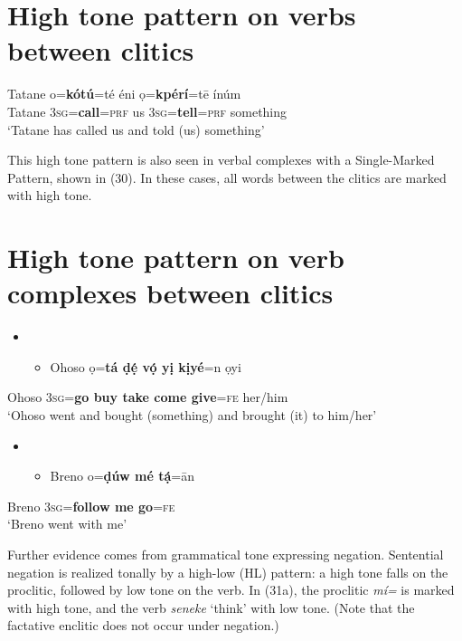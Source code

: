 \documentclass[output=paper]{langsci/langscibook}
\begin{document}
\chapter[High tone pattern on verbs between clitics]{High tone pattern on verbs between clitics}
\label{bkm:Ref436500051}\gll Tatane  o=\textbf{kótú}=té     éni   ọ=\textbf{kpérí}=t\={e}     ínúm\\
     Tatane  3\textsc{sg}=\textbf{call}=\textsc{prf}\textbf{ }  us  \textbf{ }3\textsc{sg}=\textbf{tell}=\textsc{prf}  something\\
\glt ‘Tatane has called us and told (us) something’ \citep[285]{Kari2003a} 
\z

This high tone pattern is also seen in verbal complexes with a Single-Marked Pattern, shown in (30). In these cases, all words between the clitics are marked with high tone. 

\chapter[High tone pattern on verb complexes between clitics ]{High tone pattern on verb complexes between clitics }
\label{bkm:Ref449533464}\begin{itemize}
\item \setcounter{itemize}{0}
\begin{itemize}
\item \gll Ohoso   ọ=\textbf{tá  ḍẹ́    vọ́    yị    kịyé}=n   ọyi\\
\end{itemize}
\end{itemize}
     Ohoso    \textsc{3sg}=\textbf{go  buy    take  come  give}=\textsc{fe}   her/him\\
\glt ‘Ohoso went and bought (something) and brought (it) to him/her’ \citep[121]{Kari2004}
\z

\begin{itemize}
\item \setcounter{itemize}{0}
\begin{itemize}
\item \gll Breno   o=\textbf{ḍúw    mé   tạ́}=\={a}n\\
\end{itemize}
\end{itemize}
     Breno   3\textsc{sg}=\textbf{follow  me   go}=\textsc{fe}\\
\glt ‘Breno went with me’ \citep[115]{Kari2004}
\z

Further evidence comes from grammatical tone expressing negation. Sentential negation is realized tonally by a high-low (HL) pattern: a high tone falls on the proclitic, followed by low tone on the verb. In (31a), the proclitic \textit{mí=} is marked with high tone, and the verb \textit{seneke} ‘think’ with low tone. (Note that the factative enclitic does not occur under negation.)
\end{document}
